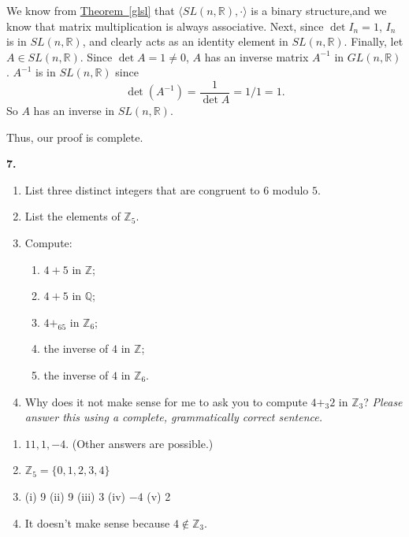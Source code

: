 \documentclass[10pt,]{book}
\theoremstyle{plain}
\theoremstyle{definition}
\theoremstyle{definition}
\theoremstyle{definition}
\theoremstyle{definition}
\numberwithin{equation}{section}
\def\Z{\mathbb{Z}}
\def\R{\mathbb{R}}
\def\Q{\mathbb{Q}}
\begin{document}
\par\smallskip
We know from \hyperref[glsl]{Theorem~\ref{glsl}} that \(\langle SL(n,\R),\cdot\rangle\) is a binary structure,and we know that matrix multiplication is always associative. Next, since \(\det I_n=1\), \(I_n\) is in \(SL(n,\R)\), and clearly acts as an identity element in \(SL(n,\R)\). Finally, let \(A\in SL(n,\R)\).  Since \(\det A=1\neq 0\), \(A\) has an inverse matrix \(A^{-1}\) in \(GL(n, \R)\).  \(A^{-1}\) is in \(SL(n,\R)\) since%
\begin{equation*}
\det(A^{-1})=\frac{1}{\det A}=1/1=1.
\end{equation*}
So \(A\) has an inverse in \(SL(n,\R)\).%
\par
Thus, our proof is complete.%
\par\smallskip
\noindent\textbf{7.}\quad{}\leavevmode%
\begin{enumerate}[label=(\alph*)]
\item\hypertarget{li-122}{}List three distinct integers that are congruent to \(6\) modulo \(5\).%
\item\hypertarget{li-123}{}List the elements of \(\Z_5\).%
\item\hypertarget{li-124}{}Compute: %
\begin{enumerate}[label=\roman*.]
\item\hypertarget{li-125}{}\(4+5\) in \(\Z\);%
\item\hypertarget{li-126}{}\(4+5\) in \(\Q\);%
\item\hypertarget{li-127}{}\(4+_65\) in \(\Z_6\);%
\item\hypertarget{li-128}{}the inverse of \(4\) in \(\Z\);%
\item\hypertarget{li-129}{}the inverse of \(4\) in \(\Z_6\).%
\end{enumerate}
%
\item\hypertarget{li-130}{}Why does it not make sense for me to ask you to compute \(4+_3 2\) in \(\Z_3\)? \emph{Please answer this using a complete, grammatically correct sentence.}%
\end{enumerate}
\par\smallskip
\leavevmode%
\begin{enumerate}[label=(\alph*)]
\item\hypertarget{li-131}{}\(11, 1, -4\). (Other answers are possible.)%
\item\hypertarget{li-132}{}\(\Z_5=\{0,1,2,3,4\}\)%
\item\hypertarget{li-133}{}(i) 9   (ii) 9   (iii) 3   (iv) \(-4\)   (v) 2%
\item\hypertarget{li-134}{}It doesn't make sense because \(4\not\in \Z_3\).%
\end{enumerate}
\end{document}
